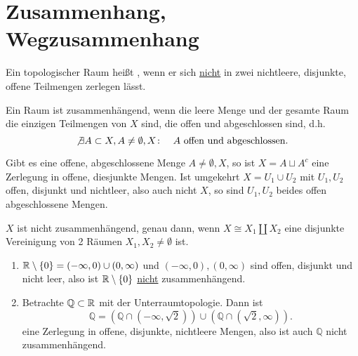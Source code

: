 
\section{Zusammenhang, Wegzusammenhang}

\begin{definition}[Zusammenhang]\label{def:zusammenhang}
    Ein topologischer Raum heißt , wenn er sich \underline{nicht} in zwei nichtleere, disjunkte, offene Teilmengen zerlegen lässt. 
\end{definition}

\begin{dlemma}\label{lm:raum-ist-zusammenhängend-gdw-offen-abgeschlossene-mengen-sind-trivial}
    Ein Raum ist zusammenhängend, wenn die leere Menge und der gesamte Raum die einzigen Teilmengen von $X$ sind, die offen und abgeschlossen sind, d.h.
     \[
    \not \exists  A\subset X, A\neq \emptyset,X \colon \quad A \text{ offen und abgeschlossen}
    .\] 
\end{dlemma}

\begin{proof*}
    Gibt es eine offene, abgeschlossene Menge $A\neq \emptyset,X$, so ist $X = A \sqcup A^{c}$ eine Zerlegung in offene, diesjunkte Mengen. Ist umgekehrt $X = U_1 \cup U_2$ mit $U_1,U_2$ offen, disjunkt und nichtleer, also auch nicht $X$, so sind $U_1,U_2$ beides offen abgeschlossene Mengen.
\end{proof*}

\begin{remark}
    $X$ ist nicht zusammenhängend, genau dann, wenn  $X \cong X_1 \coprod X_2$ eine disjunkte Vereinigung von 2 Räumen $X_1,X_2\neq \emptyset$ ist.
\end{remark}

\begin{example}
    \begin{enumerate}[1)]
        \item $\mathbb{R}\setminus \left \{0\right\}  = (-\infty,0) \cup (0,\infty)$ und $(-\infty,0),(0,\infty)$ sind offen, disjunkt und nicht leer, also ist $\mathbb{R}\setminus \left \{0\right\} $ \underline{nicht} zusammenhängend. 
        \item Betrachte $\mathbb{Q}\subset \mathbb{R}$ mit der Unterraumtopologie. Dann ist
            \[
                \mathbb{Q} = (\mathbb{Q} \cap (-\infty,\sqrt{2})) \cup (\mathbb{Q} \cap (\sqrt{2},\infty))  
            .\] 
            eine Zerlegung in offene, disjunkte, nichtleere Mengen, also ist auch $\mathbb{Q}$ nicht zusammenhängend.
    \end{enumerate}
\end{example}


